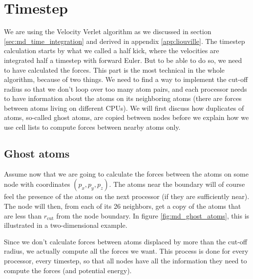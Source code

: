 \section{Timestep}
\label{sec:md_timestep}
We are using the Velocity Verlet algorithm as we discussed in section \ref{sec:md_time_integration} and derived in appendix \ref{app:liouville}. The timestep calculation starts by what we called a half kick, where the velocities are integrated half a timestep with forward Euler. But to be able to do so, we need to have calculated the forces. This part is the most technical in the whole algorithm, because of two things. We need to find a way to implement the cut-off radius so that we don't loop over too many atom pairs, and each processor needs to have information about the atoms on its neighboring atoms (there are forces between atoms living on different CPUs). We will first discuss how duplicates of atoms, so-called ghost atoms, are copied between nodes before we explain how we use cell lists to compute forces between nearby atoms only. 
\subsection{Ghost atoms}
Assume now that we are going to calculate the forces between the atoms on some node with coordinates $(p_x, p_y, p_z)$. The atoms near the boundary will of course feel the presence of the atoms on the next processor (if they are sufficiently near). The node will then, from each of its 26 neighbors, get a copy of the atoms that are less than $r_\text{cut}$ from the node boundary. In figure \ref{fig:md_ghost_atoms}, this is illustrated in a two-dimensional example.

Since we don't calculate forces between atoms displaced by more than the cut-off radius, we actually compute all the forces we want. This process is done for every processor, every timestep, so that all nodes have all the information they need to compute the forces (and potential energy).
